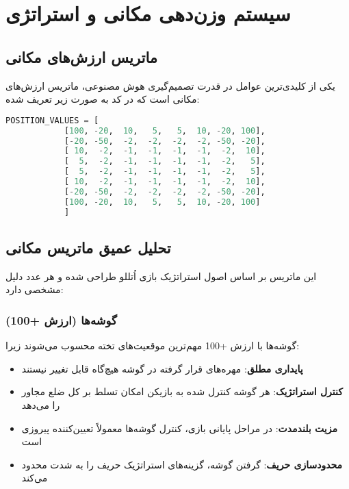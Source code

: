 \documentclass[12pt]{article}
\newenvironment{ltrcode}{\lr\bgroup}{\egroup}
\begin{document}
	
	\section{سیستم وزن‌دهی مکانی و استراتژی}
	
	\subsection{ماتریس ارزش‌های مکانی}
	
	یکی از کلیدی‌ترین عوامل در قدرت تصمیم‌گیری هوش مصنوعی، ماتریس ارزش‌های مکانی است که در کد به صورت زیر تعریف شده:
	
	\begin{ltrcode}
		\begin{lstlisting}[language=Python, caption=Position Values Matrix Definition]
			POSITION_VALUES = [
			[100, -20,  10,   5,   5,  10, -20, 100],
			[-20, -50,  -2,  -2,  -2,  -2, -50, -20],
			[ 10,  -2,  -1,  -1,  -1,  -1,  -2,  10],
			[  5,  -2,  -1,  -1,  -1,  -1,  -2,   5],
			[  5,  -2,  -1,  -1,  -1,  -1,  -2,   5],
			[ 10,  -2,  -1,  -1,  -1,  -1,  -2,  10],
			[-20, -50,  -2,  -2,  -2,  -2, -50, -20],
			[100, -20,  10,   5,   5,  10, -20, 100]
			]
		\end{lstlisting}
	\end{ltrcode}
	
	\subsection{تحلیل عمیق ماتریس مکانی}
	
	این ماتریس بر اساس اصول استراتژیک بازی اُتللو طراحی شده و هر عدد دلیل مشخصی دارد:
	
	\subsubsection{گوشه‌ها (ارزش +100)}
	
	گوشه‌ها با ارزش +100 مهم‌ترین موقعیت‌های تخته محسوب می‌شوند زیرا:
	
	\begin{itemize}
		\item \textbf{پایداری مطلق}: مهره‌های قرار گرفته در گوشه هیچ‌گاه قابل تغییر نیستند
		\item \textbf{کنترل استراتژیک}: هر گوشه کنترل شده به بازیکن امکان تسلط بر کل ضلع مجاور را می‌دهد
		\item \textbf{مزیت بلندمدت}: در مراحل پایانی بازی، کنترل گوشه‌ها معمولاً تعیین‌کننده پیروزی است
		\item \textbf{محدودسازی حریف}: گرفتن گوشه، گزینه‌های استراتژیک حریف را به شدت محدود می‌کند
	\end{itemize}
	
\end{document}

